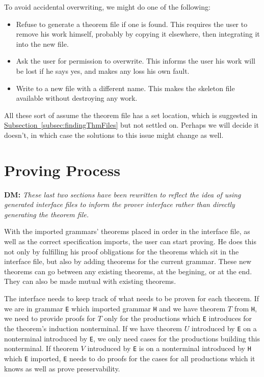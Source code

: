 \documentclass[11pt]{article}
\newcommand{\subsec}[1]{\hyperref[subsec:#1]{Subsection~\ref*{subsec:#1}}}
\newcommand{\grammar}[1]{\texttt{#1}}
\newcommand{\dnote}[1]{{\color{orange} \textbf{DM:} \emph{#1}}}
\begin{document}
To avoid accidental overwriting, we might do one of the following:
\begin{itemize}
\item Refuse to generate a theorem file if one is found.  This
  requires the user to remove his work himself, probably by copying it
  elsewhere, then integrating it into the new file.
\item Ask the user for permission to overwrite.  This informs the user
  his work will be lost if he says yes, and makes any loss his own
  fault.
\item Write to a new file with a different name.  This makes the
  skeleton file available without destroying any work.
\end{itemize}
All these sort of assume the theorem file has a set location, which is
suggested in \subsec{findingThmFiles} but not settled on.  Perhaps we
will decide it doesn't, in which case the solutions to this issue
might change as well.





\section{Proving Process}

\dnote{These last two sections have been rewritten to reflect the idea
  of using generated interface files to inform the prover interface
  rather than directly generating the theorem file.}

With the imported grammars' theorems placed in order in the interface
file, as well as the correct specification imports, the user can start
proving. He does this not only by fulfilling his proof obligations for
the theorems which sit in the interface file, but also by adding
theorems for the current grammar.  These new theorems can go between
any existing theorems, at the begining, or at the end. They can also
be made mutual with existing theorems.


The interface needs to keep track of what needs to be proven for each
theorem.
%
If we are in grammar \grammar{E} which imported grammar \grammar{H}
and we have theorem $T$ from \grammar{H}, we need to provide proofs
for $T$ only for the productions which \grammar{E} introduces for the
theorem's induction nonterminal.
%
If we have theorem $U$ introduced by \grammar{E} on a nonterminal
introduced by \grammar{E}, we only need cases for the productions
building this nonterminal.
%
If theorem $V$ introduced by \grammar{E} is on a nonterminal
introduced by \grammar{H} which \grammar{E} imported, \grammar{E}
needs to do proofs for the cases for all productions which it knows as
well as prove preservability.
\end{document}

